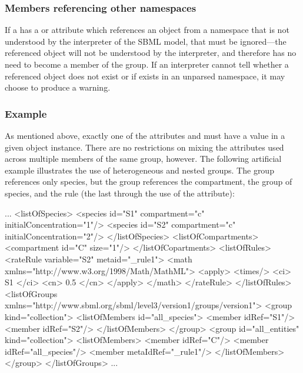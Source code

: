 \subsubsection{Members referencing other namespaces}
\label{unfindable-members}

If a \Member has a  or  attribute which references an object from a namespace that is not understood by the interpreter of the SBML model, that \Member must be ignored---the referenced object will not be understood by the interpreter, and therefore has no need to become a member of the group. If an interpreter cannot tell whether a referenced object does not exist or if exists in an unparsed namespace, it may choose to produce a warning.


\subsubsection{Example}

As mentioned above, exactly one of the attributes  and  must have a value in a given \Member object instance.  There are no restrictions on mixing the attributes used across multiple members of the same group, however.  The following artificial example illustrates the use of heterogeneous and nested groups.  The group  references only species, but the group  references the compartment, the group of species, and the rule (the last through the use of the  attribute):

\begin{example}
...
  <listOfSpecies>     
      <species id="S1" compartment="c" initialConcentration="1"/> 
      <species id="S2" compartment="c" initialConcentration="2"/> 
  </listOfSpecies>   
  <listOfCompartments>   
      <compartment id="C" size="1"/>
  </listOfCopartments>   
  <listOfRules>
      <rateRule variable="S2" metaid="_rule1">
          <math xmlns="http://www.w3.org/1998/Math/MathML">
              <apply>
                  <times/>
                  <ci> S1 </ci>
                  <cn> 0.5 </cn>
              </apply>
          </math>
      </rateRule>
  </listOfRules>
  <listOfGroups xmlns="http://www.sbml.org/sbml/level3/version1/groups/version1">   
      <group kind="collection">
          <listOfMembers id="all_species">
              <member idRef="S1"/> 
              <member idRef="S2"/> 
          </listOfMembers>
      </group> 
      <group id="all_entities" kind="collection">
          <listOfMembers>
              <member idRef="C"/> 
              <member idRef="all_species"/> 
              <member metaIdRef="_rule1"/> 
          </listOfMembers>
      </group> 
  </listOfGroups>   
...
\end{example}


